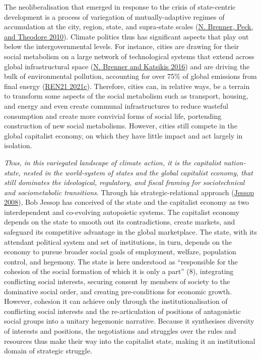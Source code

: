 \documentclass[a4paper, nobind]{templates/ociamthesis}
\begin{document}
The neoliberalisation that emerged in response to the crisis of state-centric development is a process of variegation of mutually-adaptive regimes of accumulation at the city, region, state, and supra-state scales (\protect\hyperlink{ref-brenner_variegated_2010}{N. Brenner, Peck, and Theodore 2010}). Climate politics thus has significant aspects that play out below the intergovernmental levels. For instance, cities are drawing for their social metabolism on a large network of technological systems that extend across global infrastructural space (\protect\hyperlink{ref-brenner_operational_2016}{N. Brenner and Katsikis 2016}) and are driving the bulk of environmental pollution, accounting for over 75\% of global emissions from final energy (\protect\hyperlink{ref-ren21_renewables_2021a}{REN21 2021c}). Therefore, cities can, in relative ways, be a terrain to transform some aspects of the social metabolism such as transport, housing, and energy and even create communal infrastructures to reduce wasteful consumption and create more convivial forms of social life, portending construction of new social metabolisms. However, cities still compete in the global capitalist economy, on which they have little impact and act largely in isolation.

\emph{Thus, in this variegated landscape of climate action, it is the capitalist nation-state, nested in the world-system of states and the global capitalist economy, that still dominates the ideological, regulatory, and fiscal framing for sociotechnical and sociometabolic transitions}. Through his strategic-relational approach (\protect\hyperlink{ref-jessop_state_2008}{Jessop 2008}), Bob Jessop has conceived of the state and the capitalist economy as two interdependent and co-evolving autopoietic systems. The capitalist economy depends on the state to smooth out its contradictions, create markets, and safeguard its competitive advantage in the global marketplace. The state, with its attendant political system and set of institutions, in turn, depends on the economy to pursue broader social goals of employment, welfare, population control, and hegemony. The state is here understood as ``responsible for the cohesion of the social formation of which it is only a part'' (8), integrating conflicting social interests, securing consent by members of society to the dominative social order, and creating pre-conditions for economic growth. However, cohesion it can achieve only through the institutionalisation of conflicting social interests and the re-articulation of positions of antagonistic social groups into a unitary hegemonic narrative. Because it synthesises diversity of interests and positions, the negotiations and struggles over the rules and resources thus make their way into the capitalist state, making it an institutional domain of strategic struggle.
\end{document}
